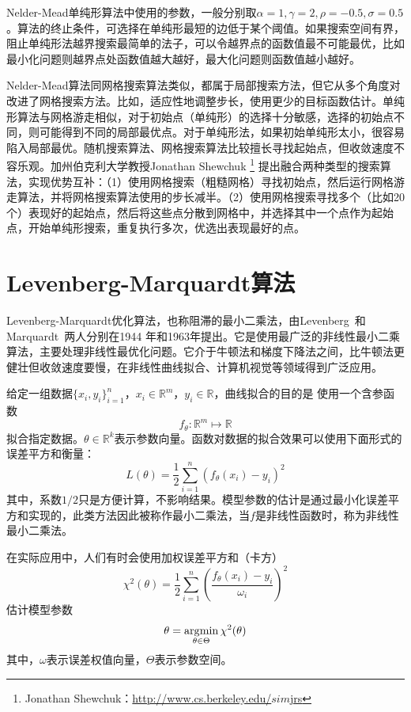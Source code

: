 Nelder-Mead单纯形算法中使用的参数，一般分别取$\alpha=1,\gamma=2, \rho=-0.5, \sigma=0.5$。算法的终止条件，可选择在单纯形最短的边低于某个阈值。如果搜索空间有界，阻止单纯形法越界搜索最简单的法子，可以令越界点的函数值最不可能最优，比如最小化问题则越界点处函数值越大越好，最大化问题则函数值越小越好。

Nelder-Mead算法同网格搜索算法类似，都属于局部搜索方法，但它从多个角度对改进了网格搜索方法。比如，适应性地调整步长，使用更少的目标函数估计。单纯形算法与网格游走相似，对于初始点（单纯形）的选择十分敏感，选择的初始点不同，则可能得到不同的局部最优点。对于单纯形法，如果初始单纯形太小，很容易陷入局部最优。随机搜索算法、网格搜索算法比较擅长寻找起始点，但收敛速度不容乐观。加州伯克利大学教授Jonathan Shewchuk
\footnote{Jonathan Shewchuk：\href{http://www.cs.berkeley.edu/\~jrs/4/lec/23}{http://www.cs.berkeley.edu/$sim$jrs}}
提出融合两种类型的搜索算法，实现优势互补：（1）使用网格搜索（粗糙网格）寻找初始点，然后运行网格游走算法，并将网格搜索算法使用的步长减半。（2）使用网格搜索寻找多个（比如20个）表现好的起始点，然后将这些点分散到网格中，并选择其中一个点作为起始点，开始单纯形搜索，重复执行多次，优选出表现最好的点。

\section{Levenberg-Marquardt算法}
Levenberg-Marquardt优化算法，也称阻滞的最小二乘法，由Levenberg~\cite{levenberg1944method}和Marquardt~\cite{marquardt1963algorithm}两人分别在1944 年和1963年提出。它是使用最广泛的非线性最小二乘算法，主要处理非线性最优化问题。它介于牛顿法和梯度下降法之间，比牛顿法更健壮但收敛速度要慢，在非线性曲线拟合、计算机视觉等领域得到广泛应用。

给定一组数据$\{x_i,y_i\}_{i=1}^n$，$x_i\in \mathbb R^m$，$y_i\in \mathbb R$，曲线拟合的目的是
使用一个含参函数
\begin{equation}
    f_{\theta}:\mathbb R^m \mapsto \mathbb R
\end{equation}
拟合指定数据。$\theta\in \mathbb R^k$表示参数向量。函数对数据的拟合效果可以使用下面形式的误差平方和衡量：
\begin{equation}
    L(\theta) = \frac{1}{2}\sum\limits_{i=1}^n (f_{\theta}(x_i) - y_i )^2
\end{equation}
其中，系数$1/2$只是方便计算，不影响结果。模型参数的估计是通过最小化误差平方和实现的，此类方法因此被称作最小二乘法，当$f$是非线性函数时，称为非线性最小二乘法。

在实际应用中，人们有时会使用加权误差平方和（卡方）
\begin{equation}
    \chi^2(\theta) = \frac{1}{2}\sum\limits_{i=1}^n (\frac{f_{\theta}(x_i) - y_i}{\omega_i} )^2
\end{equation}
估计模型参数
\begin{equation}
    \theta = \operatorname*{\mathrm{\arg\!\min}}\limits_{\theta\in \Theta} \chi^2(\theta)
\end{equation}
其中，$\omega$表示误差权值向量，$\Theta$表示参数空间。

